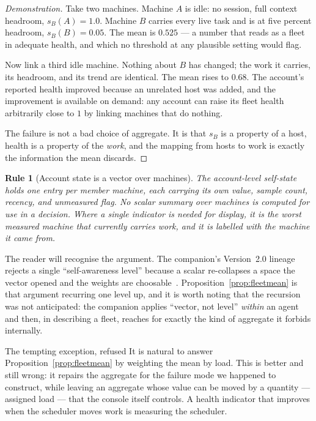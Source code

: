 \documentclass[11pt]{article}
\newtheorem{drule}{Rule}
\begin{document}
\begin{proof}[Demonstration]
Take two machines. Machine $A$ is idle: no session, full context headroom, $s_B(A) = 1.0$. Machine $B$ carries every live task and is at five percent headroom, $s_B(B) = 0.05$. The mean is $0.525$ --- a number that reads as a fleet in adequate health, and which no threshold at any plausible setting would flag.

Now link a third idle machine. Nothing about $B$ has changed; the work it carries, its headroom, and its trend are identical. The mean rises to $0.68$. The account's reported health improved because an unrelated host was added, and the improvement is available on demand: any account can raise its fleet health arbitrarily close to $1$ by linking machines that do nothing.

The failure is not a bad choice of aggregate. It is that $s_B$ is a property of a host, health is a property of the \emph{work}, and the mapping from hosts to work is exactly the information the mean discards.
\end{proof}

\begin{drule}[Account state is a vector over machines]
\label{rule:vector}
The account-level self-state holds one entry per member machine, each carrying its own value, sample count, recency, and unmeasured flag. No scalar summary over machines is computed for use in a decision. Where a single indicator is needed for display, it is the \emph{worst measured machine that currently carries work}, and it is labelled with the machine it came from.
\end{drule}

The reader will recognise the argument. The companion's Version~2.0 lineage rejects a single ``self-awareness level'' because a scalar re-collapses a space the vector opened and the weights are choosable~\citep{yang2026v2corrected}. Proposition~\ref{prop:fleetmean} is that argument recurring one level up, and it is worth noting that the recursion was not anticipated: the companion applies ``vector, not level'' \emph{within} an agent and then, in describing a fleet, reaches for exactly the kind of aggregate it forbids internally.

\begin{cautionbox}{The tempting exception, refused}
It is natural to answer Proposition~\ref{prop:fleetmean} by weighting the mean by load. This is better and still wrong: it repairs the aggregate for the failure mode we happened to construct, while leaving an aggregate whose value can be moved by a quantity --- assigned load --- that the console itself controls. A health indicator that improves when the scheduler moves work is measuring the scheduler.
\end{cautionbox}
\end{document}
